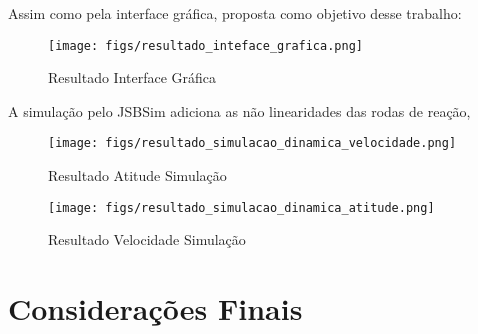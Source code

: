 Assim como pela interface gráfica, proposta como objetivo desse trabalho:

\begin{figure}[htpb]
	\centering
	\texttt{[image: figs/resultado\_inteface\_grafica.png]}
	\caption{Resultado Interface Gráfica}
	\label{fig:15}
\end{figure}

A simulação pelo JSBSim adiciona as não linearidades das rodas de reação,


\begin{figure}[htpb]
	\centering
	\texttt{[image: figs/resultado\_simulacao\_dinamica\_velocidade.png]}
	\caption{Resultado Atitude Simulação}
	\label{fig:15}
\end{figure}

\begin{figure}[htpb]
	\centering
	\texttt{[image: figs/resultado\_simulacao\_dinamica\_atitude.png]}
	\caption{Resultado Velocidade Simulação}
	\label{fig:15}
\end{figure}



\section{Considerações Finais}




